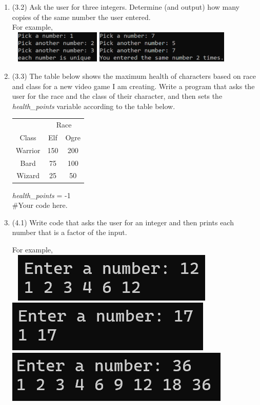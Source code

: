 \documentclass{article}
\begin{document}
\begin{enumerate}
\item (3.2)  
		Ask the user for three integers.  Determine (and output) how many copies of the same number 
		the user entered.\\
		For example, \\ \ \hfill
		\includegraphics[height = 0.6in]{./imgs/uniqueIntCount1.PNG} \hfill
		\includegraphics[height = 0.6in]{./imgs/uniqueIntCount2.PNG} \hfill \ 

	
\item (3.3)  
		The table below shows the maximum health of characters based on race and class for a new 
		video game I am creating.  Write a program that asks the user for the race and the class of 
		their character, and then sets the \textit{health\_points}	variable according to the table 
		below.
		\begin{flushright}
		\begin{tabular}{c|cc}
			& \multicolumn{2}{c}{Race}\\
			Class & Elf & Ogre \\ \hline
			Warrior & 150 & 200\\
			Bard & 75 & 100\\
			Wizard & 25 & 50 \\
		\end{tabular}
		\end{flushright}
		
		\vspace*{-6em}
		\textit{health\_points} = -1\\
		\#Your code here.
		\vspace*{3em}





\item (4.1)  
		Write code that asks the user for an integer and then prints each number that is a 
		factor of the input.
	
		For example, \\ \ \hfill
		\includegraphics[height = .35in]{./imgs/factors1.PNG} \hfill  
		\includegraphics[height = .35in]{./imgs/factors2.PNG} \hfill  
		\includegraphics[height = .35in]{./imgs/factors3.PNG} \hfill \


\end{enumerate}
\pagebreak
\end{document}
